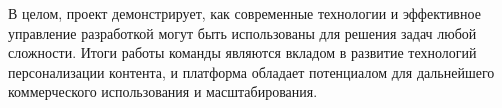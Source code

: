 В целом, проект демонстрирует, как современные технологии и эффективное управление разработкой могут быть использованы для решения задач любой сложности. Итоги работы команды являются вкладом в развитие технологий персонализации контента, и платформа обладает потенциалом для дальнейшего коммерческого использования и масштабирования.

\endinput